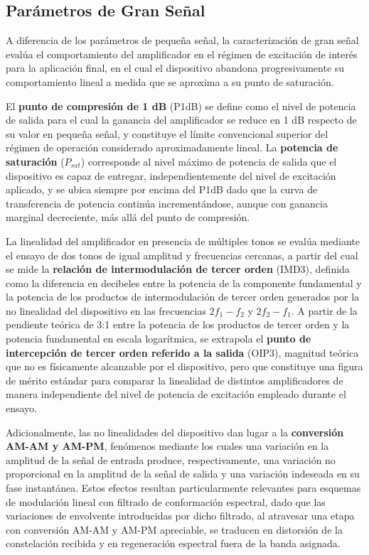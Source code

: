 \subsection{Parámetros de Gran Señal}
A diferencia de los parámetros de pequeña señal, la caracterización de gran señal evalúa el comportamiento del amplificador en el régimen de excitación de interés para la aplicación final, en el cual el dispositivo abandona progresivamente su comportamiento lineal a medida que se aproxima a su punto de saturación.

El \textbf{punto de compresión de 1 dB} (P1dB) se define como el nivel de potencia de salida para el cual la ganancia del amplificador se reduce en 1 dB respecto de su valor en pequeña señal, y constituye el límite convencional superior del régimen de operación considerado aproximadamente lineal. La \textbf{potencia de saturación} ($P_{sat}$) corresponde al nivel máximo de potencia de salida que el dispositivo es capaz de entregar, independientemente del nivel de excitación aplicado, y se ubica siempre por encima del P1dB dado que la curva de transferencia de potencia continúa incrementándose, aunque con ganancia marginal decreciente, más allá del punto de compresión.

La linealidad del amplificador en presencia de múltiples tonos se evalúa mediante el ensayo de dos tonos de igual amplitud y frecuencias cercanas, a partir del cual se mide la \textbf{relación de intermodulación de tercer orden} (IMD3), definida como la diferencia en decibeles entre la potencia de la componente fundamental y la potencia de los productos de intermodulación de tercer orden generados por la no linealidad del dispositivo en las frecuencias $2f_1 - f_2$ y $2f_2 - f_1$. A partir de la pendiente teórica de 3:1 entre la potencia de los productos de tercer orden y la potencia fundamental en escala logarítmica, se extrapola el \textbf{punto de intercepción de tercer orden referido a la salida} (OIP3), magnitud teórica que no es físicamente alcanzable por el dispositivo, pero que constituye una figura de mérito estándar para comparar la linealidad de distintos amplificadores de manera independiente del nivel de potencia de excitación empleado durante el ensayo.

Adicionalmente, las no linealidades del dispositivo dan lugar a la \textbf{conversión AM-AM y AM-PM}, fenómenos mediante los cuales una variación en la amplitud de la señal de entrada produce, respectivamente, una variación no proporcional en la amplitud de la señal de salida y una variación indeseada en su fase instantánea. Estos efectos resultan particularmente relevantes para esquemas de modulación lineal con filtrado de conformación espectral, dado que las variaciones de envolvente introducidas por dicho filtrado, al atravesar una etapa con conversión AM-AM y AM-PM apreciable, se traducen en distorsión de la constelación recibida y en regeneración espectral fuera de la banda asignada.

